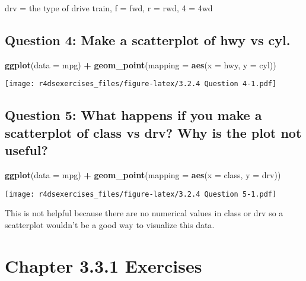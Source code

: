 \documentclass[
]{book}
\newenvironment{Shaded}{\begin{snugshade}}{\end{snugshade}}
\newcommand{\DataTypeTok}[1]{\textcolor[rgb]{0.13,0.29,0.53}{#1}}
\newcommand{\KeywordTok}[1]{\textcolor[rgb]{0.13,0.29,0.53}{\textbf{#1}}}
\newcommand{\NormalTok}[1]{#1}
\newcommand{\OperatorTok}[1]{\textcolor[rgb]{0.81,0.36,0.00}{\textbf{#1}}}
\newcommand{\StringTok}[1]{\textcolor[rgb]{0.31,0.60,0.02}{#1}}
\begin{document}
drv = the type of drive train, f = fwd, r = rwd, 4 = 4wd

\hypertarget{question-4-make-a-scatterplot-of-hwy-vs-cyl.}{%
\subsection{Question 4: Make a scatterplot of hwy vs cyl.}\label{question-4-make-a-scatterplot-of-hwy-vs-cyl.}}

\begin{Shaded}
\begin{Highlighting}[]
\KeywordTok{ggplot}\NormalTok{(}\DataTypeTok{data =}\NormalTok{ mpg) }\OperatorTok{+}
\StringTok{  }\KeywordTok{geom_point}\NormalTok{(}\DataTypeTok{mapping =} \KeywordTok{aes}\NormalTok{(}\DataTypeTok{x =}\NormalTok{ hwy, }\DataTypeTok{y =}\NormalTok{ cyl))}
\end{Highlighting}
\end{Shaded}

\texttt{[image: r4dsexercises\_files/figure-latex/3.2.4 Question 4-1.pdf]}

\hypertarget{question-5-what-happens-if-you-make-a-scatterplot-of-class-vs-drv-why-is-the-plot-not-useful}{%
\subsection{Question 5: What happens if you make a scatterplot of class vs drv? Why is the plot not useful?}\label{question-5-what-happens-if-you-make-a-scatterplot-of-class-vs-drv-why-is-the-plot-not-useful}}

\begin{Shaded}
\begin{Highlighting}[]
\KeywordTok{ggplot}\NormalTok{(}\DataTypeTok{data =}\NormalTok{ mpg) }\OperatorTok{+}
\StringTok{  }\KeywordTok{geom_point}\NormalTok{(}\DataTypeTok{mapping =} \KeywordTok{aes}\NormalTok{(}\DataTypeTok{x =}\NormalTok{ class, }\DataTypeTok{y =}\NormalTok{ drv))}
\end{Highlighting}
\end{Shaded}

\texttt{[image: r4dsexercises\_files/figure-latex/3.2.4 Question 5-1.pdf]}

This is not helpful because there are no numerical values in class or drv so a scatterplot wouldn't be a good way to visualize this data.

\hypertarget{chapter-3.3.1-exercises}{%
\section{Chapter 3.3.1 Exercises}\label{chapter-3.3.1-exercises}}
\end{document}
